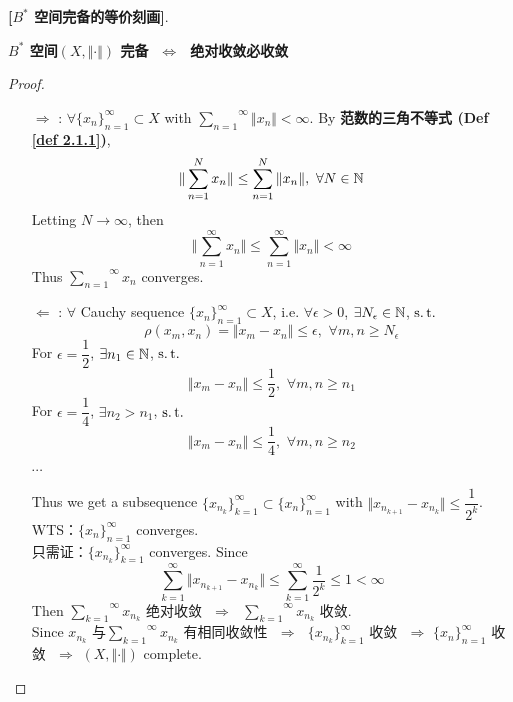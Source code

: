 	\begin{thm}\label{thm 2.1.2}
		\textbf{[$B^*$ 空间完备的等价刻画]}. 
		\begin{center}
			\textbf{$B^*$ 空间$(X , \Vert \cdot \Vert)$ 完备 $\,\, \Leftrightarrow \,\,$ 绝对收敛必收敛}
		\end{center}
		
		\vspace{3em}
		
		\begin{proof}
			\begin{enumerate}
				\item[$\Rightarrow$]: $\forall \{ x_n \}_{n = 1}^{\infty} \subset X$ with $\overset{\infty}{\underset{n = 1}{\sum}} \Vert x_n \Vert < \infty$. By \textbf{范数的三角不等式 (Def \ref{def 2.1.1})}, 
				\[ \Vert \sum_{n = 1}^{N} x_n \Vert \leq \sum_{n = 1}^{N} \Vert x_n \Vert , \,\, \forall N \in \mathbb{N} \]
				Letting $N \to \infty$, then
				\[ \Vert \sum_{n = 1}^{\infty} x_n \Vert \leq \sum_{n = 1}^{\infty} \Vert x_n \Vert < \infty \]
				Thus $\overset{\infty}{\underset{n = 1}{\sum}} x_n$ converges. 
				
				\vspace{4em}
				
				\item[$\Leftarrow$]: $\forall$ Cauchy sequence $\{ x_n \}_{n = 1}^{\infty} \subset X$, i.e. $\forall \epsilon > 0$, $\exists N_\epsilon \in \mathbb{N}$, $\operatorname{s.t.}$
				\[ \rho(x_m , x_n) = \Vert x_m - x_n \Vert \leq \epsilon , \,\, \forall m , n \geq N_\epsilon \]
				For $\epsilon = \dfrac{1}{2}$, $\exists n_1 \in \mathbb{N}$, $\operatorname{s.t.}$
				\[ \Vert x_m - x_n \Vert \leq \frac{1}{2} , \,\, \forall m , n \geq n_1 \]
				For $\epsilon = \dfrac{1}{4}$, $\exists n_2 > n_1$, $\operatorname{s.t.}$
				\[ \Vert x_m - x_n \Vert \leq \frac{1}{4} , \,\, \forall m , n \geq n_2 \]
				\begin{center}
					$\cdots$
				\end{center}
				Thus we get a subsequence $\{ x_{n_k} \}_{k = 1}^{\infty} \subset \{ x_n \}_{n = 1}^{\infty}$ with $\Vert x_{n_{k + 1}} - x_{n_k} \Vert \leq \dfrac{1}{2^k}$. \\
				WTS：$\{ x_n \}_{n = 1}^{\infty}$ converges. \\
				只需证：$\{ x_{n_k} \}_{k = 1}^{\infty}$ converges. Since
				\[ \sum_{k = 1}^{\infty} \Vert x_{n_{k + 1}} - x_{n_k} \Vert \leq \sum_{k = 1}^{\infty} \frac{1}{2^k} \leq 1 < \infty \]
				Then $\overset{\infty}{\underset{k = 1}{\sum}} x_{n_k}$ 绝对收敛 $\,\, \Rightarrow \,\,$ $\overset{\infty}{\underset{k = 1}{\sum}} x_{n_k}$ 收敛. \\
				Since $x_{n_k}$ 与$\overset{\infty}{\underset{k = 1}{\sum}} x_{n_k}$ 有相同收敛性 $\,\, \Rightarrow \,\,$ $\{ x_{n_k} \}_{k = 1}^{\infty}$ 收敛 $\,\, \Rightarrow \,\, \{ x_n \}_{n = 1}^{\infty}$ 收敛 $\,\, \Rightarrow \,\, (X , \Vert \cdot \Vert)$ complete.
			\end{enumerate}
		\end{proof}
	\end{thm}






	\ifx\allfiles\undefined

\fi